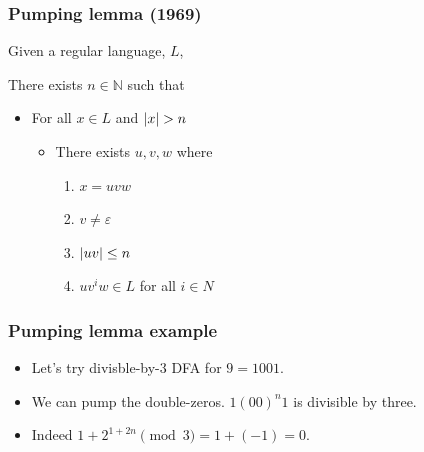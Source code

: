 \documentclass[languages_and_machines.tex]{subfiles}
\begin{document}
\begin{frame}
  \frametitle{Pumping lemma (1969)}

  Given a regular language, \(L\),

  There exists \(n \in \mathbb N\) such that \begin{itemize}
    \item For all \(x \in L\) and \(\lvert x\rvert > n\)
      \begin{itemize}
      \item  There exists \(u, v, w\) where
        \begin{enumerate}
        \item \(x = uvw\)
        \item \(v \neq \varepsilon\)
        \item \(\lvert uv\rvert \leq n\)
        \item \(uv^iw \in L\) for all \(i \in N\)
        \end{enumerate}
      \end{itemize}
    \end{itemize}
\end{frame}

\begin{frame}
  \frametitle{Pumping lemma example}


  \begin{itemize}
  \item Let's try divisble-by-3 DFA for \(9 = 1001\).
  \pause
  \item We can pump the double-zeros. \(1(00)^n1\) is divisible by three.
  \pause
  \item Indeed \(1 + 2^{1 + 2n} \pmod 3 = 1 + (-1) = 0\).
  \end{itemize}
\end{frame}
\end{document}

